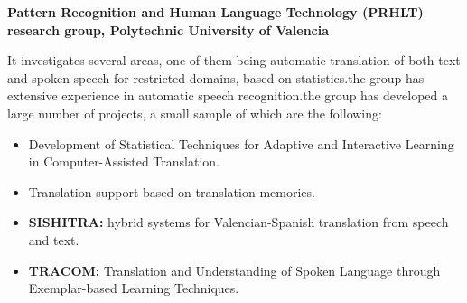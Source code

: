 \documentclass[a4paper]{article}
\theoremstyle{plain}
\theoremstyle{definition}
\begin{document}



   
   \begin{flushleft}
    \textbf{Pattern Recognition and Human Language Technology (PRHLT) research group, Polytechnic University of Valencia}
   \end{flushleft}
    It investigates several areas, one of them being automatic translation of both text and spoken speech for restricted domains, based on statistics.the group has extensive experience in automatic speech recognition.the group has developed a large number of projects, a small sample of which are the following:
     \begin{itemize}
         \item Development of Statistical Techniques for Adaptive and Interactive Learning in Computer-Assisted Translation.
         \item Translation support based on translation memories.
        \item \textbf{SISHITRA:} hybrid systems for Valencian-Spanish translation from speech and text.
        \item \textbf{TRACOM: }Translation and Understanding of Spoken Language through Exemplar-based Learning Techniques.
    \end{itemize}
   
\end{document}
